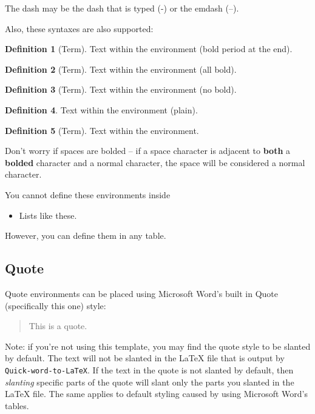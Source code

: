 \documentclass[12pt]{article}
\theoremstyle{plain}
\theoremstyle{remark}
\theoremstyle{definition}
\newtheorem{definition}{Definition}[section]
\begin{document}
The dash may be the dash that is typed (-) or the emdash (--).

Also, these syntaxes are also supported:

\begin{framed}

\begin{definition}[Term]
Text within the environment (bold
period at the end).
\end{definition}

\begin{definition}[Term]
Text within the environment (all bold).
\end{definition}

\begin{definition}[Term]
Text within the environment (no bold).
\end{definition}

\begin{definition}
Text within the environment (plain).
\end{definition}

\begin{definition}[Term]
Text within the environment.
\end{definition}

\end{framed}



Don't worry if spaces are bolded -- if a space character is adjacent to
\textbf{both} a \textbf{bolded} character and a normal character, the
space will be considered a normal character.

You cannot define these environments inside

\begin{itemize}
\item
  Lists like these.
\end{itemize}

However, you can define them in any table.


\subsection{Quote}

Quote environments can be placed using Microsoft Word's built in Quote
(specifically this one) style:

\begin{quote}
This is a quote.
\end{quote}

Note: if you're not using this template, you may find the quote style to
be slanted by default. The text will not be slanted in the LaTeX file
that is output by \texttt{Quick-word-to-LaTeX}. If the text in the quote
is not slanted by default, then \emph{slanting} specific parts of the
quote will slant only the parts you slanted in the LaTeX file. The same
applies to default styling caused by using Microsoft Word's tables.
\end{document}
